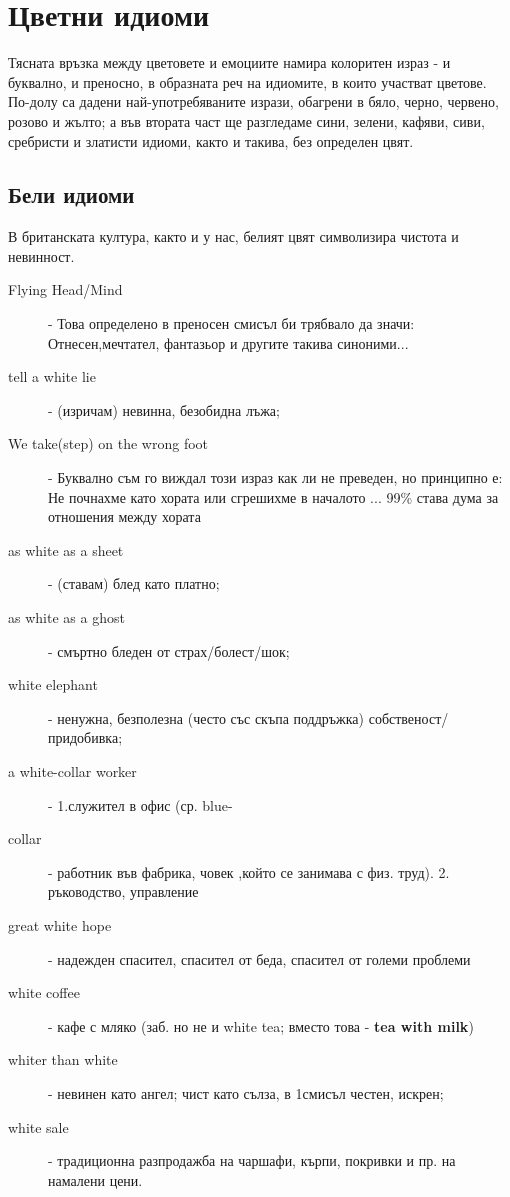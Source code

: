 \section{Цветни идиоми}
Тясната връзка между цветовете и емоциите намира колоритен израз - и буквално, и преносно, в образната реч на идиомите, в които участват цветове. По-долу са дадени най-употребяваните изрази, обагрени в бяло, черно, червено, розово и жълто; а във втората част ще разгледаме сини, зелени, кафяви, сиви, сребристи и златисти идиоми, както и такива, без определен цвят. 

\subsection{Бели идиоми}
В британската култура, както и у нас, белият цвят символизира чистота и невинност.

\begin{description}
    \item[Flying Head/Mind] - Това определено в преносен смисъл би трябвало да значи: Отнесен,мечтател, фантазьор и другите такива синоними...
    \item[tell a white lie] - (изричам) невинна, безобидна лъжа;
    \item[We take(step) on the wrong foot] - Буквално съм го виждал този израз как ли не преведен, но принципно е: Не почнахме като хората или сгрешихме в началото ... 99\% става дума за отношения между хората
    \item[as white as a sheet] - (ставам) блед като платно;
    \item[as white as a ghost] - смъртно бледен от страх/болест/шок;
    \item[white elephant] - ненужна, безполезна (често със скъпа поддръжка) собственост/придобивка;
    \item[a white-collar worker] - 1.служител в офис (ср. blue-\item[collar] - работник във фабрика, човек ,който се занимава с физ. труд). 2. ръководство, управление
    \item[great white hope] - надежден спасител, спасител от беда, спасител от големи проблеми
    \item[white coffee] - кафе с мляко (заб. но не и white tea; вместо това - \textbf{tea with milk})
    \item[whiter than white] - невинен като ангел; чист като сълза, в 1смисъл честен, искрен;
    \item[white sale] - традиционна разпродажба на чаршафи, кърпи, покривки и пр. на намалени цени.
\end{description}


